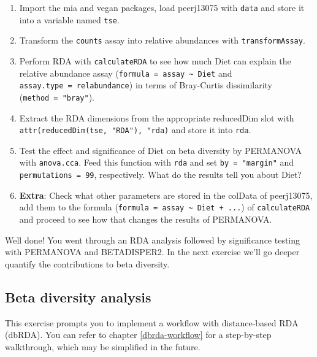 \documentclass[
]{book}
\providecommand{\tightlist}{%
  \setlength{\itemsep}{0pt}\setlength{\parskip}{0pt}}
\begin{document}
\begin{enumerate}
\def\labelenumi{\arabic{enumi}.}
\tightlist
\item
  Import the mia and vegan packages, load peerj13075 with \texttt{data} and store it
  into a variable named \texttt{tse}.
\item
  Transform the \texttt{counts} assay into relative abundances with \texttt{transformAssay}.
\item
  Perform RDA with \texttt{calculateRDA} to see how much Diet can explain the relative
  abundance assay (\texttt{formula\ =\ assay\ \textasciitilde{}\ Diet} and \texttt{assay.type\ =\ relabundance}) in
  terms of Bray-Curtis dissimilarity (\texttt{method\ =\ "bray"}).
\item
  Extract the RDA dimensions from the appropriate reducedDim slot with
  \texttt{attr(reducedDim(tse,\ "RDA"),\ "rda)} and store it into \texttt{rda}.
\item
  Test the effect and significance of Diet on beta diversity by PERMANOVA with
  \texttt{anova.cca}. Feed this function with \texttt{rda} and set \texttt{by\ =\ "margin"} and
  \texttt{permutations\ =\ 99}, respectively. What do the results tell you about Diet?
\item
  \textbf{Extra}: Check what other parameters are stored in the colData of peerj13075,
  add them to the formula (\texttt{formula\ =\ assay\ \textasciitilde{}\ Diet\ +\ ...}) of \texttt{calculateRDA}
  and proceed to see how that changes the results of PERMANOVA.
\end{enumerate}

Well done! You went through an RDA analysis followed by significance testing
with PERMANOVA and BETADISPER2. In the next exercise we'll go deeper quantify
the contributions to beta diversity.

\hypertarget{beta-diversity-analysis}{%
\subsection{Beta diversity analysis}\label{beta-diversity-analysis}}

This exercise prompts you to implement a workflow with distance-based RDA
(dbRDA). You can refer to chapter \ref{dbrda-workflow} for a step-by-step
walkthrough, which may be simplified in the future.
\end{document}
